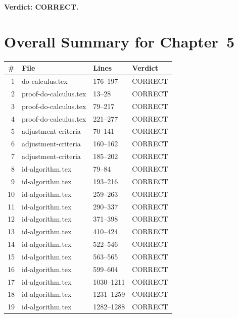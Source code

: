 \documentclass{article}
\begin{document}
\textbf{Verdict: CORRECT.}

\section*{Overall Summary for Chapter~5}

\begin{center}
\begin{tabular}{r|l|l|l}
\textbf{\#} & \textbf{File} & \textbf{Lines} & \textbf{Verdict} \\ \hline
1  & do-calculus.tex       & 176--197   & CORRECT \\
2  & proof-do-calculus.tex & 13--28     & CORRECT \\
3  & proof-do-calculus.tex & 79--217    & CORRECT \\
4  & proof-do-calculus.tex & 221--277   & CORRECT \\
5  & adjustment-criteria   & 70--141    & CORRECT \\
6  & adjustment-criteria   & 160--162   & CORRECT \\
7  & adjustment-criteria   & 185--202   & CORRECT \\
8  & id-algorithm.tex      & 79--84     & CORRECT \\
9  & id-algorithm.tex      & 193--216   & CORRECT \\
10 & id-algorithm.tex      & 259--263   & CORRECT \\
11 & id-algorithm.tex      & 290--337   & CORRECT \\
12 & id-algorithm.tex      & 371--398   & CORRECT \\
13 & id-algorithm.tex      & 410--424   & CORRECT \\
14 & id-algorithm.tex      & 522--546   & CORRECT \\
15 & id-algorithm.tex      & 563--565   & CORRECT \\
16 & id-algorithm.tex      & 599--604   & CORRECT \\
17 & id-algorithm.tex      & 1030--1211 & CORRECT \\
18 & id-algorithm.tex      & 1231--1259 & CORRECT \\
19 & id-algorithm.tex      & 1282--1288 & CORRECT \\
\end{tabular}
\end{center}
\end{document}
